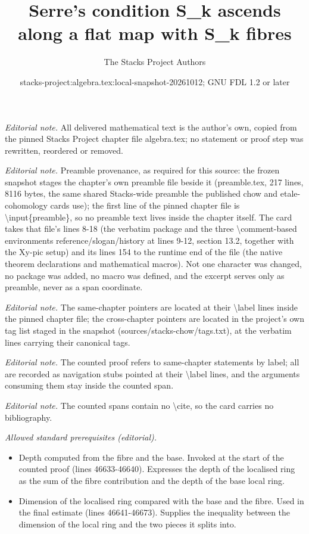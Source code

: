 \documentclass[10pt,a4paper]{amsart}
\title{Serre's condition S\_k ascends along a flat map with S\_k fibres}
\author{The Stacks Project Authors}
\date{stacks-project:algebra.tex:local-snapshot-20261012; GNU FDL 1.2 or later}
\theoremstyle{plain}
\theoremstyle{definition}
\theoremstyle{remark}
\numberwithin{equation}{subsection}
\begin{document}
\maketitle
\noindent\textit{Editorial note.} All delivered mathematical text is the author's own, copied from the pinned Stacks Project chapter file algebra.tex; no statement or proof step was rewritten, reordered or removed.\par\medskip
\noindent\textit{Editorial note.} Preamble provenance, as required for this source: the frozen snapshot stages the chapter's own preamble file beside it (preamble.tex, 217 lines, 8116 bytes, the same shared Stacks-wide preamble the published chow and etale-cohomology cards use); the first line of the pinned chapter file is \textbackslash{}input\{preamble\}, so no preamble text lives inside the chapter itself. The card takes that file's lines 8-18 (the verbatim package and the three \textbackslash{}comment-based environments reference/slogan/history at lines 9-12, section 13.2, together with the Xy-pic setup) and its lines 154 to the runtime end of the file (the native theorem declarations and mathematical macros). Not one character was changed, no package was added, no macro was defined, and the excerpt serves only as preamble, never as a span coordinate.\par\medskip
\noindent\textit{Editorial note.} The same-chapter pointers are located at their \textbackslash{}label lines inside the pinned chapter file; the cross-chapter pointers are located in the project's own tag list staged in the snapshot (sources/stacks-chow/tags.txt), at the verbatim lines carrying their canonical tags.\par\medskip
\noindent\textit{Editorial note.} The counted proof refers to same-chapter statements by label; all are recorded as navigation stubs pointed at their \textbackslash{}label lines, and the arguments consuming them stay inside the counted span.\par\medskip
\noindent\textit{Editorial note.} The counted spans contain no \textbackslash{}cite, so the card carries no bibliography.\par\medskip
\noindent\textit{Allowed standard prerequisites (editorial).}\begin{itemize}
\item Depth computed from the fibre and the base. Invoked at the start of the counted proof (lines 46633-46640). Expresses the depth of the localised ring as the sum of the fibre contribution and the depth of the base local ring.
\item Dimension of the localised ring compared with the base and the fibre. Used in the final estimate (lines 46641-46673). Supplies the inequality between the dimension of the local ring and the two pieces it splits into.
\end{itemize}\medskip
\end{document}
